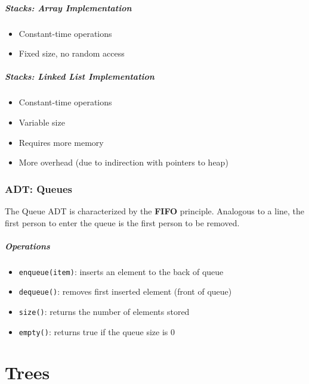 \documentclass[12pt, letterpaper]{article}
\begin{document}
\subsubsection*{Stacks: Array Implementation}

\begin{itemize}
    \item Constant-time operations
    \item Fixed size, no random access
\end{itemize}

\subsubsection*{Stacks: Linked List Implementation}

\begin{itemize}
    \item Constant-time operations
    \item Variable size
    \item Requires more memory
    \item More overhead (due to indirection with pointers to heap)
\end{itemize}

\section*{ADT: Queues}

The Queue ADT is characterized by the \textbf{FIFO} principle. Analogous to a line, the first person to enter the queue is the first person to be removed.

\subsubsection*{Operations}

\begin{itemize}
    \item \texttt{enqueue(item)}: inserts an element to the back of queue
    \item \texttt{dequeue()}: removes first inserted element (front of queue)
    \item \texttt{size()}: returns the number of elements stored
    \item \texttt{empty()}: returns true if the queue size is 0
\end{itemize}

\part{Trees}
\end{document}
